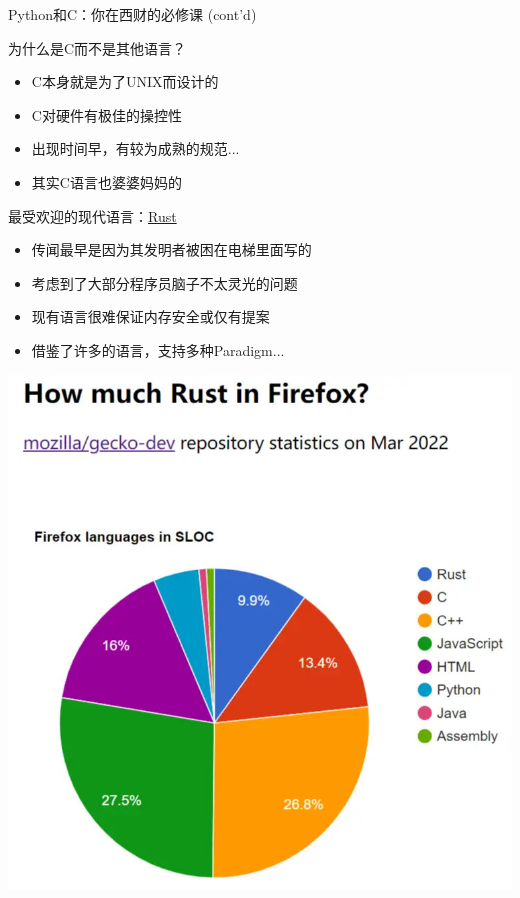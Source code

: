 \documentclass[aspectratio=1610]{beamer}
\begin{document}
\begin{frame}{Python和C：你在西财的必修课 (cont'd)}
    \begin{minipage}{0.7\linewidth}
        为什么是C而不是其他语言？
        \begin{itemize}
            \item C本身就是为了UNIX而设计的\footnotemark
            \item C对硬件有极佳的操控性
            \item 出现时间早，有较为成熟的规范...
            \item 其实C语言也婆婆妈妈的
        \end{itemize}
    
        最受欢迎的现代语言：\href{https://stackoverflow.blog/2021/03/15/getting-started-with-rust/}{\alert{Rust}}\footnotemark
        \begin{itemize}
            \item 传闻最早是因为其发明者被困在电梯里面写的
            \item 考虑到了大部分程序员脑子不太灵光的问题
            \item 现有语言很难保证内存安全或仅有提案\footnotemark
            \item 借鉴了许多的语言，支持多种Paradigm...
        \end{itemize}
    \end{minipage}
    \begin{minipage}{0.28\linewidth}
        \centering
        \includegraphics[width=\linewidth]{pic/MozillaRust.jpg}
    \end{minipage}


\end{frame}
\end{document}
